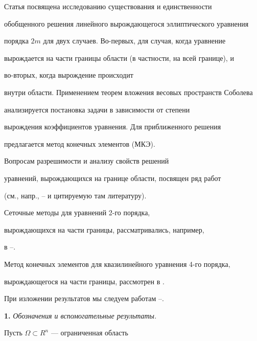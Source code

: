 

\maketitle


\label{begin}





Статья посвящена исследованию существования и единственности 


обобщенного решения линейного вырождающегося эллиптического уравнения


порядка $2m$ для двух случаев. Во-первых, для случая, когда уравнение


вырождается на части границы области (в частности, на всей границе), и


во-вторых, когда вырождение происходит


внутри области. Применением теорем вложения весовых пространств Соболева 


анализируется постановка задачи в зависимости от степени 


вырождения коэффициентов уравнения. Для приближенного решения 


предлагается метод конечных элементов (МКЭ). 





Вопросам разрешимости и анализу свойств решений 


уравнений, вырождающихся на границе области, посвящен ряд работ 


(см., напр., \cite{Keld}--\cite{LizorNik} и цитируемую там литературу). 


Сеточные методы для уравнений 2-го порядка, 


вырождающихся на части границы, рассматривались, например,


в \cite{Gusman}--\cite{Timer94}. 


Метод конечных элементов для квазилинейного уравнения 4-го порядка, 


вырождающегося на части границы, рассмотрен в \cite{Ljash99}.


При изложении результатов мы следуем работам \cite{Ljash93}--\cite{Timer92}.


\medskip





{\bf 1.} {\it Обозначения и вспомогательные результаты.} 


Пусть $\Omega \subset R^n$ --- ограниченная область


